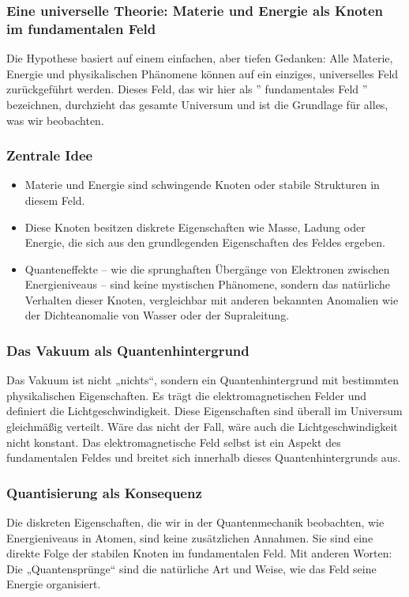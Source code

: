\documentclass[12pt,a4paper]{article}
\begin{document}
	\subsubsection{Eine universelle Theorie: Materie und Energie als Knoten im fundamentalen Feld}
	Die Hypothese basiert auf einem einfachen, aber tiefen Gedanken: Alle Materie, Energie und physikalischen Phänomene können auf ein einziges, universelles Feld zurückgeführt werden. Dieses Feld, das wir hier als '' fundamentales Feld '' bezeichnen, durchzieht das gesamte Universum und ist die Grundlage für alles, was wir beobachten.
	
	\subsubsection{Zentrale Idee}
	\begin{itemize}
		\item Materie und Energie sind schwingende Knoten oder stabile Strukturen in diesem Feld.
		\item Diese Knoten besitzen diskrete Eigenschaften wie Masse, Ladung oder Energie, die sich aus den grundlegenden Eigenschaften des Feldes ergeben.
		\item Quanteneffekte – wie die sprunghaften Übergänge von Elektronen zwischen Energieniveaus – sind keine mystischen Phänomene, sondern das natürliche Verhalten dieser Knoten, vergleichbar mit anderen bekannten Anomalien wie der Dichteanomalie von Wasser oder der Supraleitung.
	\end{itemize}
	
	\subsubsection{Das Vakuum als Quantenhintergrund}
	Das Vakuum ist nicht „nichts“, sondern ein Quantenhintergrund mit bestimmten physikalischen Eigenschaften. Es trägt die elektromagnetischen Felder und definiert die Lichtgeschwindigkeit. Diese Eigenschaften sind überall im Universum gleichmäßig verteilt. Wäre das nicht der Fall, wäre auch die Lichtgeschwindigkeit nicht konstant. Das elektromagnetische Feld selbst ist ein Aspekt des fundamentalen Feldes und breitet sich innerhalb dieses Quantenhintergrunds aus.
	
	\subsubsection{Quantisierung als Konsequenz}
	Die diskreten Eigenschaften, die wir in der Quantenmechanik beobachten, wie Energieniveaus in Atomen, sind keine zusätzlichen Annahmen. Sie sind eine direkte Folge der stabilen Knoten im fundamentalen Feld. Mit anderen Worten: Die „Quantensprünge“ sind die natürliche Art und Weise, wie das Feld seine Energie organisiert.
	
\end{document}

